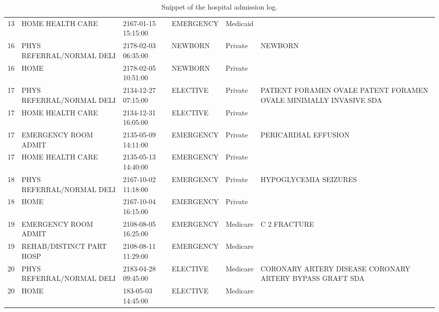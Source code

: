 \begin{appendices}
\begin{table}[!h]
\begin{tabularx}{\textwidth}{lllllp{3.6cm}}
13&HOME HEALTH CARE&2167-01-15 15:15:00&EMERGENCY&Medicaid&\\
16&PHYS REFERRAL/NORMAL DELI&2178-02-03 06:35:00&NEWBORN&Private&NEWBORN\\
16&HOME&2178-02-05 10:51:00&NEWBORN&Private&\\
17&PHYS REFERRAL/NORMAL DELI&2134-12-27 07:15:00&ELECTIVE&Private&PATIENT FORAMEN OVALE PATENT FORAMEN OVALE MINIMALLY INVASIVE SDA\\
17&HOME HEALTH CARE&2134-12-31 16:05:00&ELECTIVE&Private&\\
17&EMERGENCY ROOM ADMIT&2135-05-09 14:11:00&EMERGENCY&Private&PERICARDIAL EFFUSION\\
17&HOME HEALTH CARE&2135-05-13 14:40:00&EMERGENCY&Private&\\
18&PHYS REFERRAL/NORMAL DELI&2167-10-02 11:18:00&EMERGENCY&Private&HYPOGLYCEMIA SEIZURES\\
18&HOME&2167-10-04 16:15:00&EMERGENCY&Private&\\
19&EMERGENCY ROOM ADMIT&2108-08-05 16:25:00&EMERGENCY&Medicare&C 2 FRACTURE\\
19&REHAB/DISTINCT PART HOSP&2108-08-11 11:29:00&EMERGENCY&Medicare&\\
20&PHYS REFERRAL/NORMAL DELI&2183-04-28 09:45:00&ELECTIVE&Medicare&CORONARY ARTERY DISEASE CORONARY ARTERY BYPASS GRAFT SDA\\
20&HOME&183-05-03 14:45:00&ELECTIVE&Medicare&\\
		\bottomrule
	\end{tabularx}
	\caption[Snippet of the hospital admission log]{Snippet of the hospital admission log.}
\end{table}

\end{appendices}

\newpage\null\thispagestyle{empty}\newpage
\newpage\null\thispagestyle{empty}\newpage